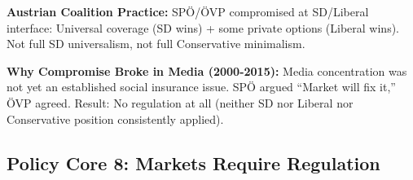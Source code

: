 \begin{tcolorbox}
\textbf{Austrian Coalition Practice:} SPÖ/ÖVP compromised at SD/Liberal interface: Universal coverage (SD wins) + some private options (Liberal wins). Not full SD universalism, not full Conservative minimalism.

\textbf{Why Compromise Broke in Media (2000-2015):} Media concentration was not yet an established social insurance issue. SPÖ argued ``Market will fix it,'' ÖVP agreed. Result: No regulation at all (neither SD nor Liberal nor Conservative position consistently applied).

\end{tcolorbox}

\subsection{Policy Core 8: Markets Require Regulation}

